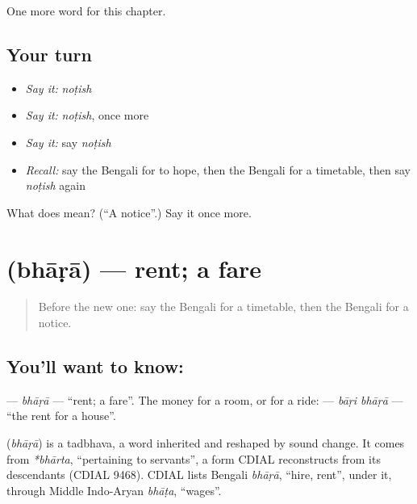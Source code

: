 \begin{grammarlens}[title={What you've built}]
One more word for this chapter.
\end{grammarlens}

\subsection*{Your turn}
\begin{itemize}
\raggedright
  \item \emph{Say it:} \emph{noṭish}
  \item \emph{Say it:} \emph{noṭish}, once more
  \item \emph{Say it:} say \emph{noṭish}
  \item \emph{Recall:} say the Bengali for to hope, then the Bengali for a timetable, then say \emph{noṭish} again
\end{itemize}

\begin{tcolorbox}[breakable,colback=teal!4,colframe=teal!35!black,title={Before you move on}]
What does  mean? (\textquotedblleft{}A notice\textquotedblright{}.) Say it once more.
\end{tcolorbox}
\section[\texorpdfstring{\bn{ভাড়া} (bhāṛā)}{ভাড়া (bhāṛā)}]{ (bhāṛā) — rent; a fare}

\label{lesson:BN-C147-bhara}



\begin{quote}
Before the new one: say the Bengali for a timetable, then the Bengali for a notice.
\end{quote}

\subsection*{You'll want to know: }
\textbf{} — \emph{bhāṛā} — \textquotedblleft{}rent; a fare\textquotedblright{}. The money for a room, or for a ride: \textbf{ } — \emph{bāṛi bhāṛā} — \textquotedblleft{}the rent for a house\textquotedblright{}.

\begin{cousinweb}
\textbf{} (\emph{bhāṛā}) is a tadbhava, a word inherited and reshaped by sound change. It comes from \emph{*bhārta}, \textquotedblleft{}pertaining to servants\textquotedblright{}, a form CDIAL reconstructs from its descendants (CDIAL 9468). CDIAL lists Bengali \emph{bhāṛā}, \textquotedblleft{}hire, rent\textquotedblright{}, under it, through Middle Indo-Aryan \emph{bhāṭa}, \textquotedblleft{}wages\textquotedblright{}.
\end{cousinweb}

